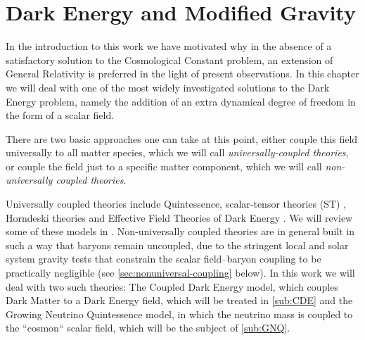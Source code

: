 %



\section{Dark Energy and Modified Gravity \label{sec:DE-MG-sec}}


In the introduction to this work we have motivated why in the absence of a satisfactory
solution to the Cosmological Constant problem, an extension of General Relativity
is preferred in the light of present observations.
In this chapter we will deal with one of the most widely investigated solutions to the Dark Energy problem,
namely the addition of an extra dynamical degree of freedom in the form of a scalar field.

There are two basic approaches one can take at this point, either couple this field universally to all matter species, which we will call \emph{ universally-coupled theories},
or couple the field just to a specific matter component, which we will call
\emph{non-universally coupled theories}.

Universally coupled theories include Quintessence, scalar-tensor theories (ST) \cite{skordis_consistent_2009,pourtsidou_models_2013-3,clifton_modified_2012,amendola_cosmology_2013, amendola_linear_2004-7, saltas_anisotropic_2014}, Horndeski theories \cite{de2012conditions, deffayet2013formal} and Effective Field Theories of Dark Energy \cite{gleyzes_essential_2013, gubitosi_effective_2013-1, }.
We will review some of these models in .
Non-universally coupled theories are in general built in such a way that baryons remain uncoupled, due to the stringent local and solar system gravity tests that constrain the scalar field--baryon coupling to be practically negligible (see \cref{sec:nonuniversal-coupling} below). In this work we will 
deal with two such theories: The Coupled Dark Energy model, which couples Dark Matter to a Dark Energy field, which will be treated in \cref{sub:CDE} and the Growing Neutrino Quintessence model, in which the neutrino mass is coupled to the ``cosmon`` scalar field, which will be the subject of \cref{sub:GNQ}.

